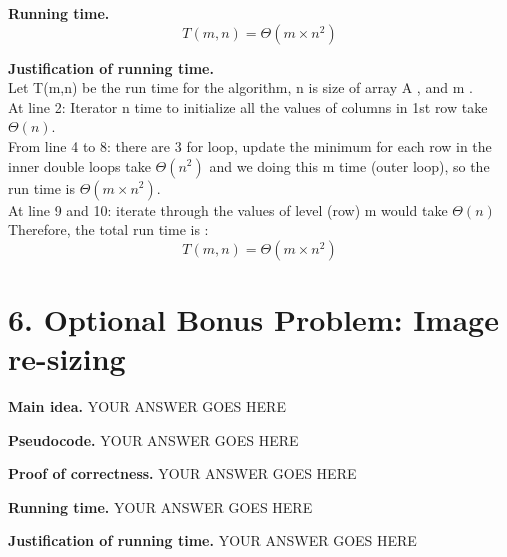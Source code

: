 \documentclass[11pt]{article}
\begin{document}
\noindent
\textbf{Running time.}
$$\boxed{T(m,n) = \Theta(m \times n^2)}$$

\noindent
\textbf{Justification of running time.}\\
Let T(m,n) be the run time for the algorithm, n is size of array A , and m .\\
At line 2: Iterator n time to initialize all the values of columns in 1st row take $\Theta(n)$.\\
From line 4 to 8: there are 3 for loop, update the minimum for each row in the inner double loops take $\Theta(n^2)$ and we doing this m time (outer loop), so the run time is $\Theta(m \times n^2)$.\\
At line 9 and 10: iterate through the values of level (row) m would take $\Theta(n)$\\
Therefore, the total run time is :\\
$$\boxed{T(m,n) = \Theta(m \times n^2)}$$


\newpage
\section*{6. Optional Bonus Problem: Image re-sizing}
\noindent
\textbf{Main idea.}
YOUR ANSWER GOES HERE


\noindent
\textbf{Pseudocode.}
YOUR ANSWER GOES HERE

\noindent
\textbf{Proof of correctness.}
YOUR ANSWER GOES HERE


\noindent
\textbf{Running time.}
YOUR ANSWER GOES HERE


\noindent
\textbf{Justification of running time.}
YOUR ANSWER GOES HERE
\end{document}
